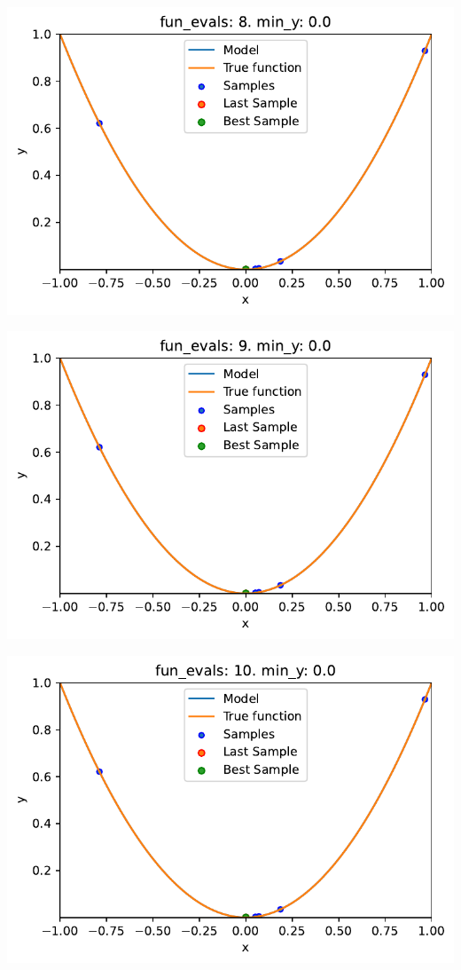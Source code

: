 \documentclass[
  letterpaper,
  DIV=11,
  numbers=noendperiod]{scrreprt}
\begin{document}
\includegraphics{010_num_spot_sklearn_surrogate_files/figure-pdf/cell-24-output-7.pdf}

\includegraphics{010_num_spot_sklearn_surrogate_files/figure-pdf/cell-24-output-8.pdf}

\includegraphics{010_num_spot_sklearn_surrogate_files/figure-pdf/cell-24-output-9.pdf}
\end{document}
